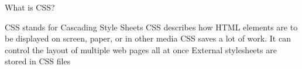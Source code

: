 What is CSS?

CSS stands for Cascading Style Sheets
CSS describes how HTML elements are to be displayed on screen, paper, or in other media
CSS saves a lot of work. It can control the layout of multiple web pages all at once
External stylesheets are stored in CSS files
